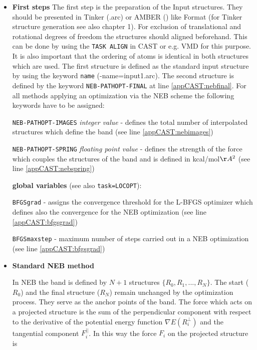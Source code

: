 \documentclass[a4paper,11pt]{scrartcl}
\begin{document}
\begin{itemize}
	\item 
\textbf{First steps}\newline
The first step is the preparation of the Input structures. They should be presented in Tinker (.arc) or AMBER () like Format (for Tinker structure generation see also chapter 1).  For exclusion of translational and rotational
degrees of freedom the structures should aligned beforehand. This can be done by using the \texttt{TASK ALIGN} in CAST or e.g. VMD for this purpose. It is also important that the ordering of atoms is identical in both structures which are used.
The first structure is defined as the standard input structure by using  the keyword \texttt{name} (-name=input1.arc). The second structure is defined by the keyword \texttt{NEB-PATHOPT-FINAL} at line \ref{appCAST:nebfinal}. For all methods applying an optimization via the NEB scheme the
following keywords have to be assigned:

\texttt{NEB-PATHOPT-IMAGES} \textit{integer value} - defines the total number of interpolated structures which define the band (see line \ref{appCAST:nebimages})\newline

\texttt{NEB-PATHOPT-SPRING} \textit{floating point value} - defines the strength of the force which couples the structures of the band and is defined in kcal/mol$\AA^{2}$ (see line \ref{appCAST:nebspring}) \newline

\textbf{global variables} (see also \texttt{task=LOCOPT}):\newline

\texttt{BFGSgrad} - assigns the convergence threshold for the L-BFGS optimizer which defines also the convergence for the NEB optimization (see line \ref{appCAST:bfgsgrad})\newline

\texttt{BFGSmaxstep} -  maximum number of steps carried out in a NEB optimization (see line \ref{appCAST:bfgsgrad})\newline




\item \textbf{Standard NEB method}

In NEB the band is defined by $N+1$ structures $\{ R_{0},R_{1},...,R_{N} \}$. The start ($R_{0}$) and the final structure ($R_{N}$) remain unchanged by the optimization process. They serve as the anchor points of the band. The force which acts on a projected structure is the sum of the perpendicular component with respect to the derivative of the potential energy function $\nabla E(R^{\bot}_{i})$ and the tangential component $F^{||}_{i}$. In this way the force $F_{i}$ on the projected structure is


\end{itemize}
\end{document}
